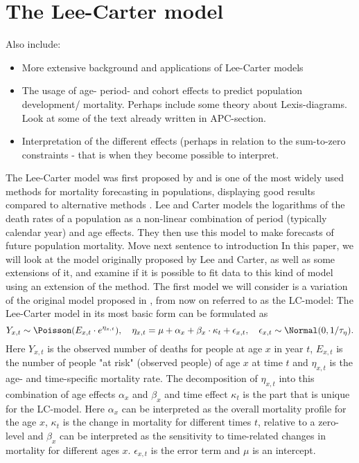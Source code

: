 \newpage
\section{The Lee-Carter model}
\label{section:Lee-Carter}
\textcolor{myDarkGreen}{
Also include:
\begin{itemize}
    \item More extensive background and applications of Lee-Carter models
    \item The usage of age- period-  and cohort effects to predict population development/ mortality. Perhaps include some theory about Lexis-diagrams. Look at some of the text already written in APC-section. 
    \item Interpretation of the different effects (perhaps in relation to the sum-to-zero constraints - that is when they become possible to interpret.
\end{itemize}
}
The Lee-Carter model was first proposed by \citet{LeeCarter1992} and is one of the most widely used methods for mortality forecasting in populations, displaying good results compared to alternative methods \cite{booth_tickle_2008}. Lee and Carter models the logarithms of the death rates of a population as a non-linear combination of period (typically calendar year) and age effects. They then use this model to make forecasts of future population mortality. 
\textcolor{myDarkGreen}{Move next sentence to introduction}
In this paper, we will look at the model originally proposed by Lee and Carter, as well as some extensions of it, and examine if it is possible to fit data to this kind of model using an extension of the \inla method. 
\newline 
The first model we will consider is a variation of the original model proposed in \cite{LeeCarter1992}, from now on referred to as the LC-model:
\textcolor{myDarkGreen}{The Lee-Carter model in its most basic form can be formulated as }
\begin{equation}
Y_{x,t} \sim \Poisson(E_{x,t}\cdot e^{\eta_{x,t}}), \quad \eta_{x,t}= \mu + \alpha_x + \beta_x\cdot\kappa_t + \epsilon_{x,t},\quad \epsilon_{x,t} \sim \Normal(0,1/\tau_{\eta}).
\label{eq:LC-model}
\end{equation}
Here $Y_{x,t}$ is the observed number of deaths for people at age $x$ in year $t$, $E_{x,t}$ is the number of people "at risk" (observed people) of age $x$ at time $t$ and $\eta_{x,t}$ is the age- and time-specific mortality rate. The decomposition of $\eta_{x,t}$ into this combination of age effects $\alpha_x$ and $\beta_x$ and time effect $\kappa_t$ is the part that is unique for the LC-model. Here $\alpha_x$ can be interpreted as the overall mortality profile for the age $x$, $\kappa_t$ is the change in mortality for different times $t$, relative to a zero-level and $\beta_x$ can be interpreted as the sensitivity to time-related changes in mortality for different ages $x$. $\epsilon_{x,t}$ is the error term and $\mu$ is an intercept. 
